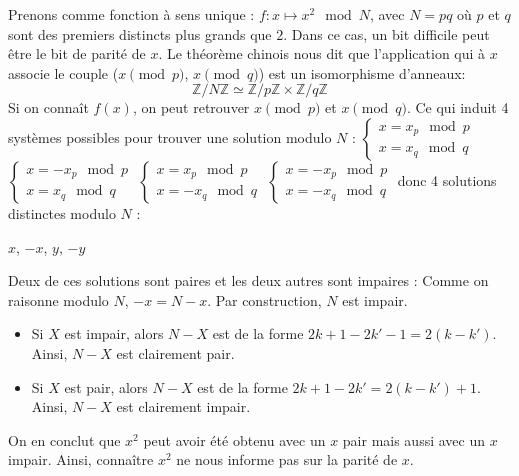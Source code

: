 \documentclass[utf8,10pt,french]{beamer}
\newcommand{\Z}{\mathbb{Z}}
\begin{document}
\begin{frame}
\begin{example}
Prenons comme fonction à sens unique : $f:x \mapsto x^2 \mod{N}$, avec $N=pq$ où $p$ et $q$ sont des premiers distincts plus grands que $2$. Dans ce cas, un bit difficile peut être le bit de parité de $x$. \pause
 Le théorème chinois nous dit que l'application qui à $x$ associe le couple ($x \pmod{p}$, $x \pmod{q}$) est un isomorphisme d'anneaux: $$ \Z /N \Z \simeq \Z/p \Z \times \Z /q \Z$$ 
Si on connaît $f(x)$, on peut retrouver $x \pmod{p}$ et $x \pmod{q}$. Ce qui induit 4 systèmes possibles pour trouver une solution modulo $N$ :
$\begin{cases}
x=x_p \mod{p}\\
x=x_q \mod{q} 
\end{cases}$ \pause
$\begin{cases}
x=-x_p \mod{p}\\
x=x_q \mod{q}
\end{cases}$ \pause
$\begin{cases}
x=x_p \mod{p}\\
x=-x_q \mod{q}
\end{cases}$ \pause
$\begin{cases}
x=-x_p \mod{p}\\
x=-x_q \mod{q}
\end{cases}$ \pause
 donc 4 solutions distinctes modulo $N$ : 
\begin{center}
$x$, $-x$, $y$, $-y$
\end{center}
\end{example}
\end{frame}

\begin{frame}
\begin{example}
Deux de ces solutions sont paires et les deux autres sont impaires :
Comme on raisonne modulo $N$, $-x=N-x$. Par construction, $N$ est impair.
\begin{itemize}
\item Si $X$ est impair, alors $N-X$ est de la forme $2k+1-2k'-1=2(k-k')$. Ainsi, $N-X$ est clairement pair. \pause
\item Si $X$ est pair, alors $N-X$ est de la forme $2k+1 - 2k'=2(k-k')+1$. Ainsi, $N-X$ est clairement impair. \pause
\end{itemize}
On en conclut que $x^2$ peut avoir été obtenu avec un $x$ pair mais aussi avec un $x$ impair. Ainsi, connaître $x^2$ ne nous informe pas sur la parité de $x$.
\end{example}
\end{frame}
\end{document}

